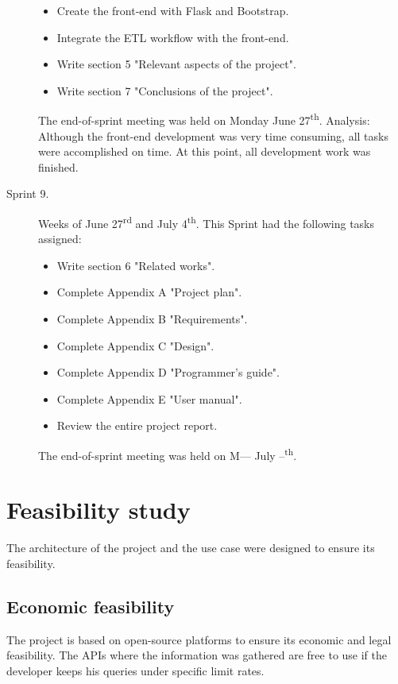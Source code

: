 \begin{description}
\begin{itemize}
		\item Create the front-end with Flask and Bootstrap.
		\item Integrate the ETL workflow with the front-end.
		\item Write section 5 "Relevant aspects of the project".
		\item Write section 7 "Conclusions of the project".
	\end{itemize}
	The end-of-sprint meeting was held on Monday June 27\textsuperscript{th}. Analysis: Although the front-end development was very time consuming, all tasks were accomplished on time. At this point, all development work was finished.
	\item[Sprint 9.] Weeks of June 27\textsuperscript{rd} and July 4\textsuperscript{th}. This Sprint had the following tasks assigned:
	\begin{itemize}
		\item Write section 6 "Related works".
		\item Complete Appendix A "Project plan".
		\item Complete Appendix B "Requirements".
		\item Complete Appendix C "Design".
		\item Complete Appendix D "Programmer's guide".
		\item Complete Appendix E "User manual".
		\item Review the entire project report.
	\end{itemize}
	The end-of-sprint meeting was held on M--- July --\textsuperscript{th}.
\end{description}

\section{Feasibility study}
\nonzeroparskip The architecture of the project and the use case were designed to ensure its feasibility.

\subsection{Economic feasibility}
\nonzeroparskip The project is based on open-source platforms to ensure its economic and legal feasibility. The APIs where the information was gathered are free to use if the developer keeps his queries under specific limit rates.

